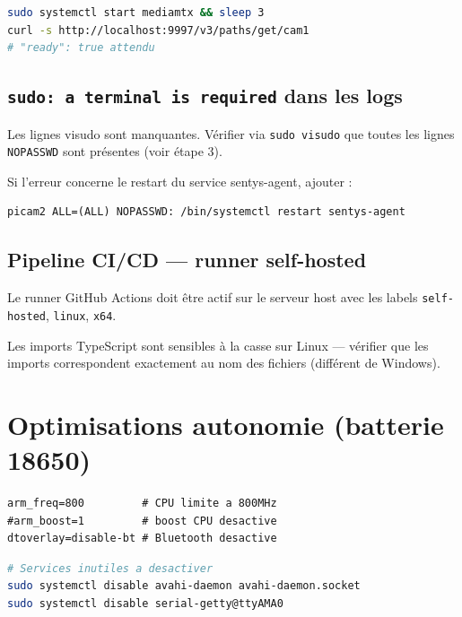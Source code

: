 \documentclass[12pt,a4paper]{article}
\begin{document}
\begin{lstlisting}[language=bash]
sudo systemctl start mediamtx && sleep 3
curl -s http://localhost:9997/v3/paths/get/cam1
# "ready": true attendu
\end{lstlisting}

\subsection{\texttt{sudo: a terminal is required} dans les logs}

Les lignes visudo sont manquantes. Vérifier via \texttt{sudo visudo} que toutes les lignes
\texttt{NOPASSWD} sont présentes (voir étape 3).

Si l'erreur concerne le restart du service sentys-agent, ajouter :
\begin{lstlisting}
picam2 ALL=(ALL) NOPASSWD: /bin/systemctl restart sentys-agent
\end{lstlisting}

\subsection{Pipeline CI/CD — runner self-hosted}

Le runner GitHub Actions doit être actif sur le serveur host avec les labels
\texttt{self-hosted}, \texttt{linux}, \texttt{x64}.

Les imports TypeScript sont sensibles à la casse sur Linux — vérifier que les imports
correspondent exactement au nom des fichiers (différent de Windows).

\section{Optimisations autonomie (batterie 18650)}

\begin{lstlisting}[caption={/boot/firmware/config.txt}]
arm_freq=800         # CPU limite a 800MHz
#arm_boost=1         # boost CPU desactive
dtoverlay=disable-bt # Bluetooth desactive
\end{lstlisting}

\begin{lstlisting}[language=bash]
# Services inutiles a desactiver
sudo systemctl disable avahi-daemon avahi-daemon.socket
sudo systemctl disable serial-getty@ttyAMA0
\end{lstlisting}
\end{document}
